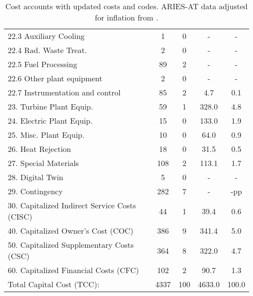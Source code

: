 \begin{table}[h!]
{\begin{tabular}{lcccc}
\hspace{10mm}22.3 Auxiliary Cooling & 1 & 0 & - & - \\
\hspace{10mm}22.4 Rad. Waste Treat. & 2 & 0 & - & - \\
\hspace{10mm}22.5 Fuel Processing & 89 & 2 & - & - \\
\hspace{10mm}22.6 Other plant equipment & 2 & 0 & - & - \\
\hspace{10mm}22.7 Instrumentation and control & 85 & 2 & 4.7 & 0.1 \\
\hspace{5mm}23. Turbine Plant Equip. & 59 & 1 & 328.0 & 4.8 \\
\hspace{5mm}24. Electric Plant Equip. & 15 & 0 & 133.0 & 1.9 \\
\hspace{5mm}25. Misc. Plant Equip. & 10 & 0 & 64.0 & 0.9 \\
\hspace{5mm}26. Heat Rejection & 18 & 0 & 31.5 & 0.5 \\
\hspace{5mm}27. Special Materials & 108 & 2 & 113.1 & 1.7 \\
\hspace{5mm}28. Digital Twin & 5 & 0 & - & - \\
\hspace{5mm}29. Contingency & 282 & 7 & - & -pp \\
30. Capitalized Indirect Service Costs (CISC) & 44 & 1 & 39.4 & 0.6 \\
40. Capitalized Owner’s Cost (COC) & 386 & 9 & 341.4 & 5.0 \\
50. Capitalized Supplementary Costs (CSC) & 364 & 8 & 322.0 & 4.7 \\
60. Capitalized Financial Costs (CFC) & 102 & 2 & 90.7 & 1.3 \\
\hline
Total Capital Cost (TCC): & 4337 & 100 & 4633.0 & 100.0 \\
\hline
\end{tabular}
}
\caption{Cost accounts with updated costs and codes. ARIES-AT data adjusted for inflation from \cite{gordon1986mirror}.}
\label{tab:costs_updated_codes}
\end{table}


